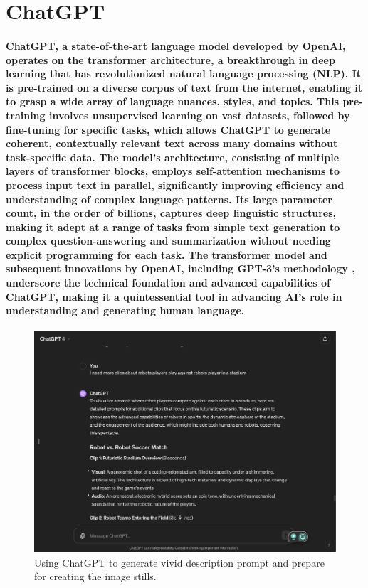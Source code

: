 \documentclass[11pt,a4paper,oneside]{report}
\begin{document}
\section{ChatGPT}
\paragraph{ChatGPT, a state-of-the-art language model developed by OpenAI, operates on the transformer architecture, a breakthrough in deep learning that has revolutionized natural language processing (NLP). It is pre-trained on a diverse corpus of text from the internet, enabling it to grasp a wide array of language nuances, styles, and topics. This pre-training involves unsupervised learning on vast datasets, followed by fine-tuning for specific tasks, which allows ChatGPT to generate coherent, contextually relevant text across many domains without task-specific data. The model's architecture, consisting of multiple layers of transformer blocks, employs self-attention mechanisms to process input text in parallel, significantly improving efficiency and understanding of complex language patterns. Its large parameter count, in the order of billions, captures deep linguistic structures, making it adept at a range of tasks from simple text generation to complex question-answering and summarization without needing explicit programming for each task. The transformer model \cite{vaswani2017attention} and subsequent innovations by OpenAI, including GPT-3's methodology \cite{brown2020language}, underscore the technical foundation and advanced capabilities of ChatGPT, making it a quintessential tool in advancing AI's role in understanding and generating human language.}

\begin{figure}[htbp]
  \centering
  \includegraphics[width=\textwidth]{ChatGPT.png}
  \caption{Using ChatGPT to generate vivid description prompt and prepare for creating the image stills.}
\end{figure}
\end{document}
